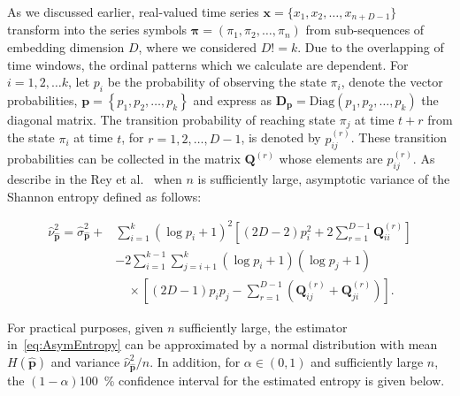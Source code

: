 As we discussed earlier, real-valued time series $\mathbf{x}=\{x_1,x_2,\dots,x_{n+D-1}\}$  transform into the series symbols $\mathbf{{\pi}}=({\pi}_1, {\pi}_2,\dots, {\pi}_n)$ from sub-sequences of embedding dimension $D$, where we considered $D!=k$. Due to the overlapping of time windows, the ordinal patterns which we calculate are dependent. 
For $i=1,2,\dots k$, let $p_i$ be the probability of observing the state $\pi_i$, denote the vector probabilities, $\mathbf{p}={\left\{p_1,p_2,\dots,p_k\right\}}$ and express as $\mathbf{D_p}=\text{Diag}(p_1,p_2, \dots, p_k)$ the diagonal matrix. 
The transition probability of reaching state $\pi_j$ at time 
$t+r$ from the state $\pi_i$ at time $t$, for $r=1,2,\dots,D-1$, is denoted by $p^{(r)}_{ij}$. These transition probabilities can be collected in the matrix $\mathbf{Q}^{(r)}$ whose elements are  $p^{(r)}_{ij}$. As describe in the Rey et al.~\cite{Rey2023a} when $n$ is sufficiently large, asymptotic variance of the Shannon entropy defined as follows:

\begin{equation}
	\begin{split}
		\widehat{\nu}^2_{\widehat{\mathbf{p}}} = \widehat{\sigma}^2_{\widehat{\mathbf{p}}} + 
		& \sum_{i=1}^{k}(\log p_i + 1)^2 
		\left[ (2D - 2)p_i^2 + 2\sum_{r=1}^{D-1} \mathbf{Q}^{(r)}_{ii} \right] \\
		& - 2 \sum_{i=1}^{k-1} \sum_{j=i+1}^{k} (\log p_i + 1)(\log p_j + 1) \\
		& \quad \times \left[ (2D - 1)p_i p_j - \sum_{r=1}^{D-1} \left( \mathbf{Q}^{(r)}_{ij} + \mathbf{Q}^{(r)}_{ji} \right) \right].
	\end{split}
	\label{eq:asympvar}
\end{equation} 


For practical purposes, given $n$ sufficiently large, the estimator in~\eqref{eq:AsymEntropy} can be approximated by a normal distribution with mean $H(\widehat{\mathbf{p}})$ and variance $\widehat{\nu}^2_{\widehat{\mathbf{p}}}/n$. In addition, for $\alpha \in (0,1)$ and sufficiently large $n$, the $(1-\alpha)$\SI{100}{\percent} confidence interval for the estimated entropy is given below.

